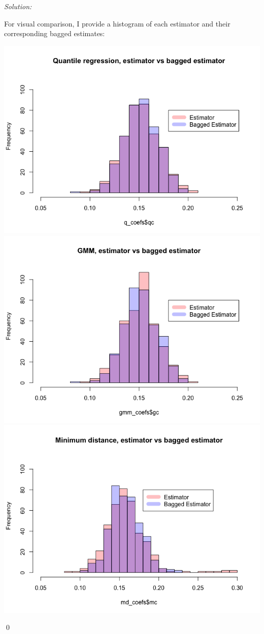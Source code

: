 \documentclass[12pt]{article}
\newenvironment{sol}
    {\emph{Solution:}
    }
    {
    \qed
    }
\begin{document}
\begin{sol}
\begin{enumerate}[label=\alph*) ]
    For visual comparison, I provide a histogram of each estimator and their corresponding bagged estimates:
    \begin{center}
      \includegraphics[scale=0.5]{qreg_comp.png}
      \includegraphics[scale=0.5]{gmm_comp.png}
      \includegraphics[scale=0.5]{md_comp.png}

\end{center}
\end{enumerate}
\end{sol}
\end{document}
